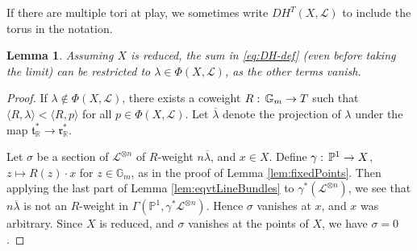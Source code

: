 \documentclass[10pt,a4paper]{amsart}
\newtheorem{lemma}[Thm]{Lemma}
\newcommand{\RR}{\mathbb{R}}
\newcommand{\PP}{\mathbb{P}}
\newcommand\lie[1]{{\mathfrak #1}}
\newcommand\tensor\otimes
\newcommand\calL{{\mathcal L}}
\newcommand\Gm{{\mathbb G}_m}
\renewcommand{\colon}{\mathrel{:}}
\renewcommand{\colon}{:\mkern\thinmuskip}
\begin{document}
If there are multiple tori at play, we sometimes write $DH^T(X, \calL)$
to include the torus in the notation.

\begin{lemma}\label{lem:multDiagram}
  Assuming $X$ is reduced,
  the sum in \eqref{eq:DH-def} (even before taking the limit) can be restricted to
  $\lambda \in \Phi(X,\calL)$, as the other terms vanish.
\end{lemma}

\begin{proof}
  If $\lambda \notin \Phi(X,\calL)$, there exists a coweight
  $R\colon \Gm\to T$ such that
  $\langle R, \lambda\rangle < \langle R, p\rangle$ for all
  $p\in \Phi(X,\calL)$.  Let $\overline\lambda$ denote the projection
  of $\lambda$ under the map $\lie t^*_\RR \to \lie r^*_\RR$.
  
  Let $\sigma$ be a section of $\calL^{\tensor n}$ of $R$-weight
  $n\overline\lambda$, and $x\in X$. 
  Define $\gamma\colon \PP^1 \to X$, $z\mapsto R(z)\cdot x$ for
  $z\in \Gm$, as in the proof of Lemma \ref{lem:fixedPoints}.
  Then applying the last part of Lemma \ref{lem:eqvtLineBundles}
  to $\gamma^*(\calL^{\tensor n})$, we see that $n\overline\lambda$
  is not an $R$-weight in $\Gamma(\PP^1,\gamma^*\calL^{\tensor n})$.
  Hence $\sigma$ vanishes at $x$, and $x$ was arbitrary.
  Since $X$ is reduced, and $\sigma$ vanishes at the points of $X$,
  we have $\sigma=0$.
\end{proof}
\end{document}
